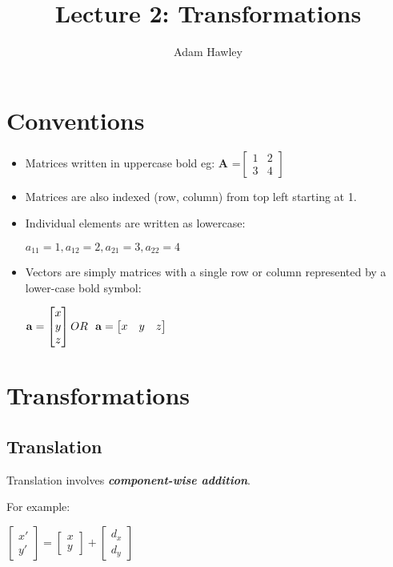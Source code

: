 \documentclass{article}
\author{Adam Hawley}
\title{Lecture 2: Transformations}
\begin{document}
\maketitle
\tableofcontents
\newpage
\section{Conventions}
\begin{itemize}
	\item Matrices written in uppercase bold eg:
{\bf A} =$ 
\begin{bmatrix}
1&2\\
3&4
\end{bmatrix}
$
\item Matrices are also indexed (row, column) from top left starting at 1.
\item Individual elements are written as lowercase: 
	\\  \centerline{ $ a_{11} = 1, a_{12} = 2, a_{21} = 3, a_{22} = 4 $ }
\item Vectors are simply matrices with a single row or column represented by a lower-case bold symbol:

	\centerline{ $ {\bf a} = 
		\begin{bmatrix}
			x\\y\\z
		\end{bmatrix} OR \ \ {\bf a} = 
		\begin{bmatrix}
			x&y&z
		\end{bmatrix}
	$ }
\end{itemize}

\section{Transformations}
\subsection{Translation}
Translation involves {\textbf{\textit{component-wise addition}}}.

For example: \\
\centerline{$
\begin{bmatrix}
	x' \\ y'
\end{bmatrix}
=
\begin{bmatrix}
	x \\ y
\end{bmatrix}
+
\begin{bmatrix}
	d_x \\ d_y
\end{bmatrix}
$}
\end{document}
